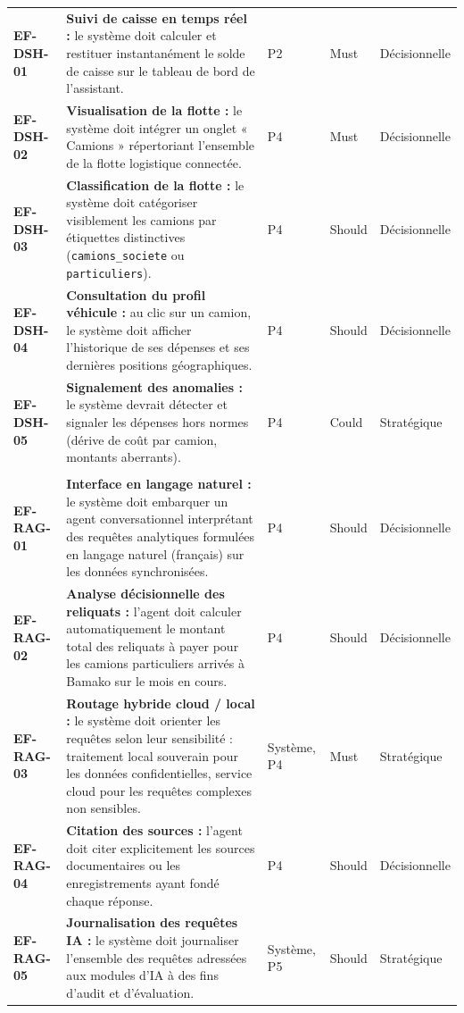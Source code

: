 \begin{longtable}{|>{\raggedright\arraybackslash}p{1.5cm}|>{\raggedright\arraybackslash}p{5.2cm}|>{\raggedright\arraybackslash}p{1.6cm}|>{\raggedright\arraybackslash}p{1.7cm}|>{\raggedright\arraybackslash}p{2.8cm}|}
\multicolumn{5}{|l|}{\cellcolor[HTML]{DDEBF7}\textbf{M4. Tableau de bord décisionnel}} \\ \hline
\textbf{EF-DSH-01} & \textbf{Suivi de caisse en temps réel :} le système doit calculer et restituer instantanément le solde de caisse sur le tableau de bord de l'assistant. & P2 & Must & Décisionnelle \\ \hline
\textbf{EF-DSH-02} & \textbf{Visualisation de la flotte :} le système doit intégrer un onglet « Camions » répertoriant l'ensemble de la flotte logistique connectée. & P4 & Must & Décisionnelle \\ \hline
\textbf{EF-DSH-03} & \textbf{Classification de la flotte :} le système doit catégoriser visiblement les camions par étiquettes distinctives (\texttt{camions\_societe} ou \texttt{particuliers}). & P4 & Should & Décisionnelle \\ \hline
\textbf{EF-DSH-04} & \textbf{Consultation du profil véhicule :} au clic sur un camion, le système doit afficher l'historique de ses dépenses et ses dernières positions géographiques. & P4 & Should & Décisionnelle \\ \hline
\textbf{EF-DSH-05} & \textbf{Signalement des anomalies :} le système devrait détecter et signaler les dépenses hors normes (dérive de coût par camion, montants aberrants). & P4 & Could & Stratégique \\ \hline

\multicolumn{5}{|l|}{\cellcolor[HTML]{DDEBF7}\textbf{M5. Module conversationnel hybride (RAG)}} \\ \hline
\textbf{EF-RAG-01} & \textbf{Interface en langage naturel :} le système doit embarquer un agent conversationnel interprétant des requêtes analytiques formulées en langage naturel (français) sur les données synchronisées. & P4 & Should & Décisionnelle \\ \hline
\textbf{EF-RAG-02} & \textbf{Analyse décisionnelle des reliquats :} l'agent doit calculer automatiquement le montant total des reliquats à payer pour les camions particuliers arrivés à Bamako sur le mois en cours. & P4 & Should & Décisionnelle \\ \hline
\textbf{EF-RAG-03} & \textbf{Routage hybride cloud / local :} le système doit orienter les requêtes selon leur sensibilité : traitement local souverain pour les données confidentielles, service cloud pour les requêtes complexes non sensibles. & Système, P4 & Must & Stratégique \\ \hline
\textbf{EF-RAG-04} & \textbf{Citation des sources :} l'agent doit citer explicitement les sources documentaires ou les enregistrements ayant fondé chaque réponse. & P4 & Should & Décisionnelle \\ \hline
\textbf{EF-RAG-05} & \textbf{Journalisation des requêtes IA :} le système doit journaliser l'ensemble des requêtes adressées aux modules d'IA à des fins d'audit et d'évaluation. & Système, P5 & Should & Stratégique \\ \hline


\end{longtable}
